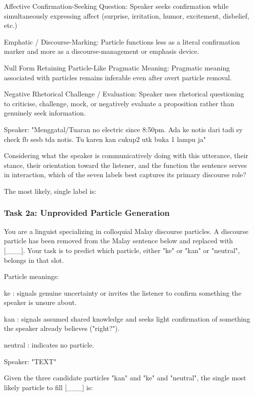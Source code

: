 \documentclass[11pt]{article}
\begin{document}
\begin{PromptBlock}
Affective Confirmation-Seeking Question: Speaker seeks confirmation while simultaneously expressing affect (surprise, irritation, humor, excitement, disbelief, etc.)

Emphatic / Discourse-Marking: Particle functions less as a literal confirmation marker and more as a discourse-management or emphasis device.

Null Form Retaining Particle-Like Pragmatic Meaning: Pragmatic meaning associated with particles remains inferable even after overt particle removal.

Negative Rhetorical Challenge / Evaluation: Speaker uses rhetorical questioning to criticise, challenge, mock, or negatively evaluate a proposition rather than genuinely seek information.

Speaker: "Menggatal/Tuaran no electric since 8:50pm. Ada ke notis dari tadi sy check fb sesb tda notis. Tu karen kan cukup2 utk buka 1 lampu ja"

Considering what the speaker is communicatively doing with this utterance, their stance, their orientation toward the listener, and the function the sentence serves in interaction, which of the seven labels best captures its primary discourse role?

The most likely, single label is:
\end{PromptBlock}

\subsubsection{Task 2a: Unprovided Particle Generation}
\begin{PromptBlock}
You are a linguist specializing in colloquial Malay discourse particles. A discourse particle has been removed from the Malay sentence below and replaced with [\_\_\_]. Your task is to predict which particle, either "ke" or "kan" or "neutral", belongs in that slot.

Particle meanings:

ke  : signals genuine uncertainty or invites the listener to confirm something the speaker is unsure about.

kan : signals assumed shared knowledge and seeks light confirmation of something the speaker already believes ("right?").

neutral : indicates no particle.

Speaker: "{TEXT}"

Given the three candidate particles "kan" and "ke" and "neutral", the single most likely particle to fill [\_\_\_] is:
\end{PromptBlock}
\end{document}
